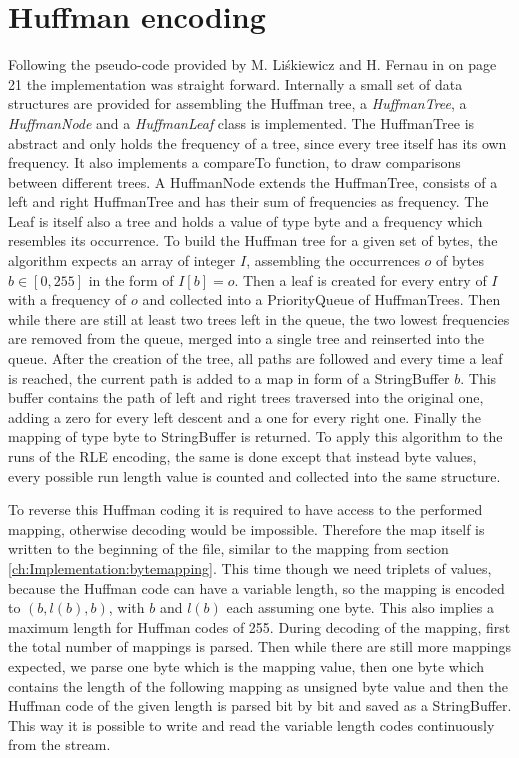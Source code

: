 \section{Huffman encoding}
\label{ch:Implementation:Huffman}
\par{
Following the pseudo-code provided by M. Liśkiewicz and H. Fernau in \cite{entropy-fernau} on page 21 the implementation was straight forward. Internally a small set of data structures are provided for assembling the Huffman tree, a \emph{HuffmanTree}, a \emph{HuffmanNode} and a \emph{HuffmanLeaf} class is implemented. The HuffmanTree is abstract and only holds the frequency of a tree, since every tree itself has its own frequency. It also implements a compareTo function, to draw comparisons between different trees. A HuffmanNode extends the HuffmanTree, consists of a left and right HuffmanTree and has their sum of frequencies as frequency. The Leaf is itself also a tree and holds a value of type byte and a frequency which resembles its occurrence. To build the Huffman tree for a given set of bytes, the algorithm expects an array of integer $I$, assembling the occurrences $o$ of bytes $b \in [ 0,255 ]$ in the form of $I [ b ] = o$. Then a leaf is created for every entry of $I$ with a frequency of $o$ and collected into a PriorityQueue of HuffmanTrees. Then while there are still at least two trees left in the queue, the two lowest frequencies are removed from the queue, merged into a single tree and reinserted into the queue. After the creation of the tree, all paths are followed and every time a leaf is reached, the current path is added to a map in form of a StringBuffer $b$. This buffer contains the path of left and right trees traversed into the original one, adding a zero for every left descent and a one for every right one. Finally the mapping of type byte to StringBuffer is returned. To apply this algorithm to the runs of the RLE encoding, the same is done except that instead byte values, every possible run length value is counted and collected into the same structure.
}
\par{
To reverse this Huffman coding it is required to have access to the performed mapping, otherwise decoding would be impossible. Therefore the map itself is written to the beginning of the file, similar to the mapping from section \ref{ch:Implementation:bytemapping}. This time though we need triplets of values, because the Huffman code can have a variable length, so the mapping is encoded to $(b,l(b),b)$, with $b$ and $l(b)$ each assuming one byte. This also implies a maximum length for Huffman codes of 255. During decoding of the mapping, first the total number of mappings is parsed. Then while there are still more mappings expected, we parse one byte which is the mapping value, then one byte which contains the length of the following mapping as unsigned byte value and then the Huffman code of the given length is parsed bit by bit and saved as a StringBuffer. This way it is possible to write and read the variable length codes continuously from the stream. 
}
